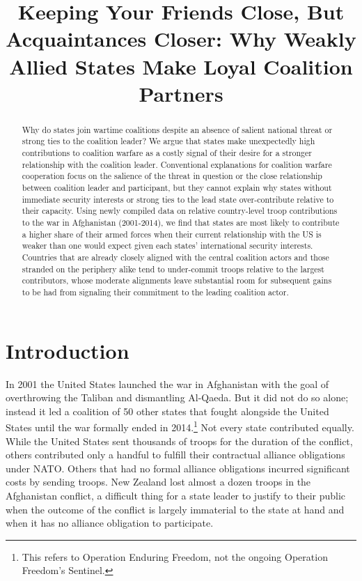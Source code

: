 \documentclass[12pt,letterpaper]{article}
\title{Keeping Your Friends Close, But Acquaintances Closer: Why Weakly Allied States Make Loyal Coalition Partners}
\begin{document}
	
\begin{singlespace}
\maketitle

\begin{abstract}
Why do states join wartime coalitions despite an absence of salient national threat or strong ties to the coalition leader? We argue that states make unexpectedly high contributions to coalition warfare as a costly signal of their desire for a stronger relationship with the coalition leader. Conventional explanations for coalition warfare cooperation focus on the salience of the threat in question or the close relationship between coalition leader and participant, but they cannot explain why states without immediate security interests or strong ties to the lead state over-contribute relative to their capacity. Using newly compiled data on relative country-level troop contributions to the war in Afghanistan (2001-2014), we find that states are most likely to contribute a higher share of their armed forces when their current relationship with the US is weaker than one would expect given each states' international security interests. Countries that are already closely aligned with the central coalition actors and those stranded on the periphery alike tend to under-commit troops relative to the largest contributors, whose moderate alignments leave substantial room for subsequent gains to be had from signaling their commitment to the leading coalition actor.
\end{abstract}
\end{singlespace}

\section{Introduction}
	In 2001 the United States launched the war in Afghanistan with the goal of overthrowing the Taliban and dismantling Al-Qaeda. But it did not do so alone; instead it led a coalition of 50 other states that fought alongside the United States until the war formally ended in 2014.\footnote{This refers to Operation Enduring Freedom, not the ongoing Operation Freedom's Sentinel.} Not every state contributed equally. While the United States sent thousands of troops for the duration of the conflict, others contributed only a handful to fulfill their contractual alliance obligations under NATO. Others that had no formal alliance obligations incurred significant costs by sending troops. New Zealand lost almost a dozen troops in the Afghanistan conflict, a difficult thing for a state leader to justify to their public when the outcome of the conflict is largely immaterial to the state at hand and when it has no alliance obligation to participate.
\end{document}
